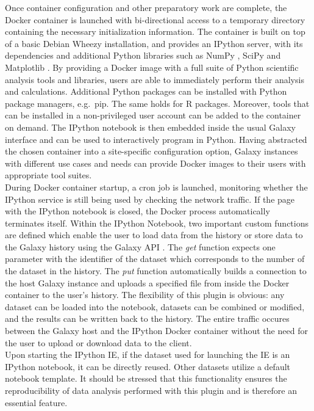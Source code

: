 \documentclass{bioinfo}
\begin{document}
\begin{methods}
Once container configuration and other preparatory work are complete, the Docker container is launched with bi-directional
access to a temporary directory containing the necessary initialization information. The container is built on top of a basic Debian Wheezy installation,
and provides an IPython server, with its dependencies and additional Python libraries such as NumPy \citep{Walt2011}, SciPy \citep{Jones2015} and Matplotlib \citep{Hunter2007}.
By providing a Docker image with a full suite of Python scientific analysis tools and libraries, users are able 
to immediately perform their analysis and calculations. Additional Python packages can be installed with Python
package managers, e.g.\ pip. The same holds for R packages. Moreover, tools that can be installed in a non-privileged user account can be added to the container on demand. 
The IPython notebook is then embedded inside the usual Galaxy interface and can be used to interactively program in Python.
Having abstracted the chosen container into a site-specific configuration option, Galaxy instances with different use cases
and needs can provide Docker images to their users with appropriate tool suites.\\
During Docker container startup, a cron job is launched, monitoring whether the IPython service
is still being used by checking the network traffic. If the page with the IPython notebook is closed, the
Docker process automatically terminates itself. Within the IPython Notebook, 
two important custom functions are defined which enable the
user to load data from the history or store data to the Galaxy history using the Galaxy API \citep{Sloggett2013}.
The \textit{get} function expects one parameter with the identifier of the dataset which corresponds to the number
of the dataset in the history. The \textit{put} function automatically builds a connection to the host
Galaxy instance and uploads a specified file from inside the Docker container to the user's
history. The flexibility of this plugin is obvious: any dataset can be
loaded into the notebook, datasets can be combined or modified, and the results can be written back to the history.
The entire traffic occures between the Galaxy host and the IPython Docker container without the need for the user to upload or download data to the client. \\
Upon starting the IPython IE, if the dataset used for launching the IE is an IPython
notebook, it can be directly reused. Other datasets utilize a default notebook template. It should be stressed that
this functionality ensures the reproducibility of data analysis performed with this plugin and is therefore an essential
feature.



\end{methods}
\end{document}
